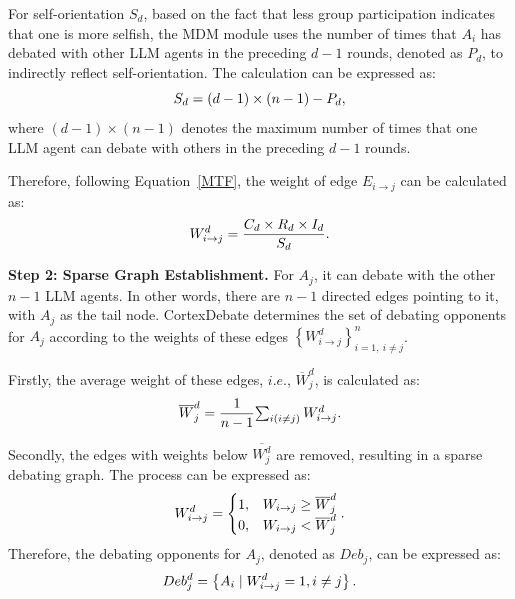 For self-orientation $S_{d}$, based on the fact that less group participation indicates that one is more selfish, the MDM module uses the number of times that $A_{i}$ has debated with other LLM agents in the preceding $d-1$ rounds, denoted as $P_{d}$, to indirectly reflect self-orientation. The calculation can be expressed as:
\begin{equation}
\setlength{\abovedisplayskip}{1mm}
\setlength{\belowdisplayskip}{1mm}
\label{8}
  S_{d}=(d-1) \times (n-1) - P_{d},
\end{equation}
\noindent where $(d-1) \times (n-1)$ denotes the maximum number of times that one LLM agent can debate with others in the preceding $d-1$ rounds.

Therefore, following Equation~\eqref{MTF}, the weight of edge $E_{i\to j}$ can be calculated as:
\begin{equation}
\setlength{\abovedisplayskip}{1mm}
\setlength{\belowdisplayskip}{1mm}
\label{9}
  W_{i\to j}^{d}= \frac{C_{d}\times R_{d}\times I_{d}}{S_{d}}.
\end{equation}

\textbf{Step 2: Sparse Graph Establishment.} For $A_{j}$, it can debate with the other $n-1$ LLM agents. In other words, there are $n-1$ directed edges pointing to it, with $A_{j}$ as the tail node. CortexDebate determines the set of debating opponents for $A_{j}$ according to the weights of these edges $\left \{ W_{i\to j}^{d}  \right \}_{i=1, \ i \ne j}^{n}$.

Firstly, the average weight of these edges, $\textit{i.e.}$, $\overline{{W }}_{j}^{d}$, is calculated as:
\begin{equation}
\setlength{\abovedisplayskip}{1mm}
\setlength{\belowdisplayskip}{1mm}
\label{10}
  \overline{{W }}_{j}^{d} = \frac{1}{n-1} {\textstyle \sum_{i(i\ne j)}^{} W_{i\to j}^{d}}.
\end{equation}

Secondly, the edges with weights below $\overline{{W_{j}^{d} }}$ are removed, resulting in a sparse debating graph. The process can be expressed as:
\begin{equation}
\setlength{\abovedisplayskip}{1mm}
\setlength{\belowdisplayskip}{1mm}
\label{11}
  W_{i\to j}^{d} = \left\{\begin{matrix}1,
  & W_{i\to j}\ge  \overline{{W }}_{j}^{d} \\0,
  & W_{i\to j}<   \overline{{W }}_{j}^{d}
\end{matrix}\right..
\end{equation}
Therefore, the debating opponents for $A_{j}$, denoted as $Deb_{j}$, can be expressed as:
\begin{equation}
\setlength{\abovedisplayskip}{1mm}
\setlength{\belowdisplayskip}{1mm}
\label{12}
  Deb_{j}^{d} = \left \{ A_{i}\mid W_{i\to j}^{d}= 1, i\ne j \right \}.
\end{equation}

